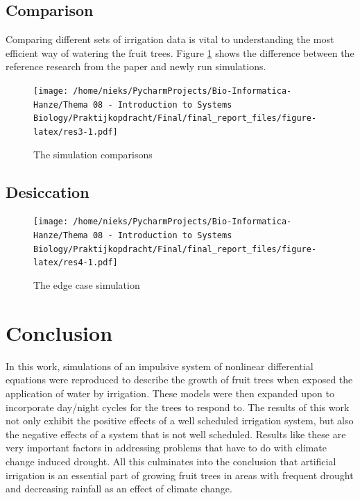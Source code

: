 \documentclass[
]{article}
\begin{document}
\newpage

\hypertarget{comparison}{%
\subsection{Comparison}\label{comparison}}

Comparing different sets of irrigation data is vital to understanding
the most efficient way of watering the fruit trees. Figure
\ref{fig:fig4} shows the difference between the reference research from
the paper and newly run simulations.

\begin{figure}
\centering
\texttt{[image: /home/nieks/PycharmProjects/Bio-Informatica-Hanze/Thema 08 - Introduction to Systems Biology/Praktijkopdracht/Final/final\_report\_files/figure-latex/res3-1.pdf]}
\caption{\label{fig:fig4}The simulation comparisons}
\end{figure}

\newpage

\hypertarget{desiccation}{%
\subsection{Desiccation}\label{desiccation}}

\begin{figure}
\centering
\texttt{[image: /home/nieks/PycharmProjects/Bio-Informatica-Hanze/Thema 08 - Introduction to Systems Biology/Praktijkopdracht/Final/final\_report\_files/figure-latex/res4-1.pdf]}
\caption{\label{fig:fig5}The edge case simulation}
\end{figure}

\newpage

\hypertarget{conclusion}{%
\section{Conclusion}\label{conclusion}}

In this work, simulations of an impulsive system of nonlinear
differential equations were reproduced to describe the growth of fruit
trees when exposed the application of water by irrigation. These models
were then expanded upon to incorporate day/night cycles for the trees to
respond to. The results of this work not only exhibit the positive
effects of a well scheduled irrigation system, but also the negative
effects of a system that is not well scheduled. Results like these are
very important factors in addressing problems that have to do with
climate change induced drought. All this culminates into the conclusion
that artificial irrigation is an essential part of growing fruit trees
in areas with frequent drought and decreasing rainfall as an effect of
climate change.
\end{document}
